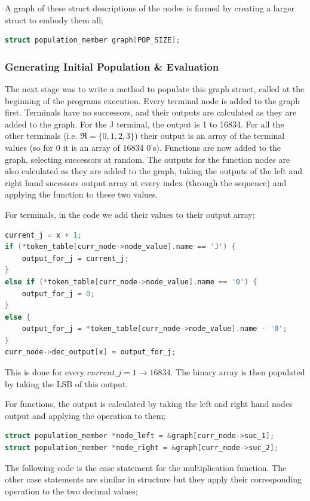 \documentclass[a4paper,10.5pt]{article}
\begin{document}
A graph of these struct descriptions of the nodes is formed by creating a larger struct to embody them all;

\begin{lstlisting}[language=C]
struct population_member graph[POP_SIZE];
\end{lstlisting}

\subsubsection{Generating Initial Population \& Evaluation}
The next stage was to write a method to populate this graph struct, called at the beginning of the programs execution. Every terminal node is added to the graph first. Terminals have no successors, and their outputs are calculated as they are added to the graph. For the J terminal, the output is 1 to 16834. For all the other terminals (i.e. $\Re = \{0, 1, 2, 3\}$) their output is an array of the terminal values (so for 0 it is an array of 16834 0's). Functions are now added to the graph, selecting successors at random. The outputs for the function nodes are also calculated as they are added to the graph, taking the outputs of the left and right hand sucessors output array at every index (through the sequence) and applying the function to these two values.


For terminals, in the code we add their values to their output array;
\begin{lstlisting}[language=C]
current_j = x + 1;
if (*token_table[curr_node->node_value].name == 'J') {
	output_for_j = current_j;
}
else if (*token_table[curr_node->node_value].name == '0') {
	output_for_j = 0;
}
else {
	output_for_j = *token_table[curr_node->node_value].name - '0'; 
}
curr_node->dec_output[x] = output_for_j;
\end{lstlisting}

This is done for every $current\_j = 1 \to 16834$. The binary array is then populated by taking the LSB of this output.

For functions, the output is calculated by taking the left and right hand nodes output and applying the operation to them;

\begin{lstlisting}[language=C]
struct population_member *node_left = &graph[curr_node->suc_1];
struct population_member *node_right = &graph[curr_node->suc_2];
\end{lstlisting}

The following code is the case statement for the multiplication function. The other case statements are similar in structure but they apply their corresponding operation to the two decimal values;
\end{document}
